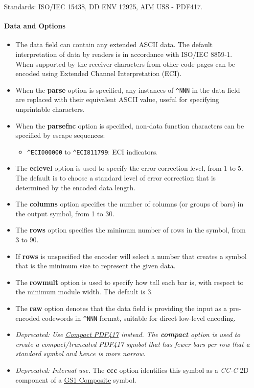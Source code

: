 Standards: ISO/IEC 15438, DD ENV 12925, AIM USS - PDF417.

\hypertarget{data-and-options-14}{%
\paragraph{Data and Options}\label{data-and-options-14}}

\begin{itemize}
\tightlist
\item
  The data field can contain any extended ASCII data. The default
  interpretation of data by readers is in accordance with ISO/IEC
  8859-1. When supported by the receiver characters from other code
  pages can be encoded using Extended Channel Interpretation (ECI).
\item
  When the \textbf{parse} option is specified, any instances of
  \texttt{\^{}NNN} in the data field are replaced with their equivalent
  ASCII value, useful for specifying unprintable characters.
\item
  When the \textbf{parsefnc} option is specified, non-data function
  characters can be specified by escape sequences:

  \begin{itemize}
  \tightlist
  \item
    \texttt{\^{}ECI000000} to \texttt{\^{}ECI811799}: ECI indicators.
  \end{itemize}
\item
  The \textbf{eclevel} option is used to specify the error correction
  level, from 1 to 5. The default is to choose a standard level of error
  correction that is determined by the encoded data length.
\item
  The \textbf{columns} option specifies the number of columns (or groups
  of bars) in the output symbol, from 1 to 30.
\item
  The \textbf{rows} option specifies the minimum number of rows in the
  symbol, from 3 to 90.
\item
  If \textbf{rows} is unspecified the encoder will select a number that
  creates a symbol that is the minimum size to represent the given data.
\item
  The \textbf{rowmult} option is used to specify how tall each bar is,
  with respect to the minimum module width. The default is 3.
\item
  The \textbf{raw} option denotes that the data field is providing the
  input as a pre-encoded codewords in \texttt{\^{}NNN} format, suitable
  for direct low-level encoding.
\item
  \emph{Deprecated: Use \protect\hyperlink{compact-pdf417}{Compact
  PDF417} instead. The \textbf{compact} option is used to create a
  compact/truncated PDF417 symbol that has fewer bars per row that a
  standard symbol and hence is more narrow.}
\item
  \emph{Deprecated: Internal use.} The \textbf{ccc} option identifies
  this symbol as a \emph{CC-C} 2D component of a
  \protect\hyperlink{gs1-composite-symbols}{GS1 Composite} symbol.
\end{itemize}

